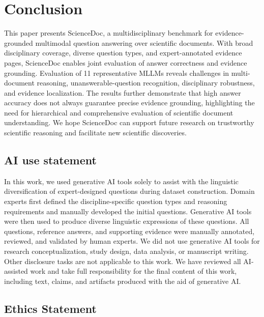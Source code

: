 \documentclass{article} %
\begin{document}
\section{Conclusion}

This paper presents ScienceDoc, a multidisciplinary benchmark for evidence-grounded multimodal question answering over scientific documents. With broad disciplinary coverage, diverse question types, and expert-annotated evidence pages, ScienceDoc enables joint evaluation of answer correctness and evidence grounding. Evaluation of 11 representative MLLMs reveals challenges in multi-document reasoning, unanswerable-question recognition, disciplinary robustness, and evidence localization. The results further demonstrate that high answer accuracy does not always guarantee precise evidence grounding, highlighting the need for hierarchical and comprehensive evaluation of scientific document understanding. We hope ScienceDoc can support future research on trustworthy scientific reasoning and facilitate new scientific discoveries.



\subsection*{AI use statement}

In this work, we used generative AI tools solely to assist with the linguistic diversification of expert-designed questions during dataset construction. Domain experts first defined the discipline-specific question types and reasoning requirements and manually developed the initial questions. Generative AI tools were then used to produce diverse linguistic expressions of these questions. All questions, reference answers, and supporting evidence were manually annotated, reviewed, and validated by human experts. We did not use generative AI tools for research conceptualization, study design, data analysis, or manuscript writing. Other disclosure tasks are not applicable to this work. We have reviewed all AI-assisted work and take full responsibility for the final content of this work, including text, claims, and artifacts produced with the aid of generative AI.

\subsection*{Ethics Statement}
\end{document}
